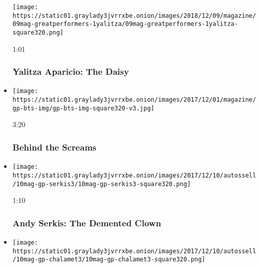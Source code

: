 \begin{itemize}
  \texttt{[image: https://static01.graylady3jvrrxbe.onion/images/2018/12/09/magazine/09mag-greatperformers-1yalitza/09mag-greatperformers-1yalitza-square320.png]}

  1:01

  \hypertarget{yalitza-aparicio-the-daisy}{%
  \subsubsection{Yalitza Aparicio: The
  Daisy}\label{yalitza-aparicio-the-daisy}}
\item
  \href{https://www.nytimes3xbfgragh.onion/video/magazine/100000005593268/behind-the-screams.html?action=click\&module=video-series-bar\&region=header\&pgtype=Article\&playlistId=video/great-performers}{}

  \texttt{[image: https://static01.graylady3jvrrxbe.onion/images/2017/12/01/magazine/gp-bts-img/gp-bts-img-square320-v3.jpg]}

  3:20

  \hypertarget{behind-the-screams}{%
  \subsubsection{Behind the Screams}\label{behind-the-screams}}
\item
  \href{https://www.nytimes3xbfgragh.onion/video/magazine/100000005588849/andy-serkis-the-demented-clown.html?action=click\&module=video-series-bar\&region=header\&pgtype=Article\&playlistId=video/great-performers}{}

  \texttt{[image: https://static01.graylady3jvrrxbe.onion/images/2017/12/10/autossell/10mag-gp-serkis3/10mag-gp-serkis3-square320.png]}

  1:10

  \hypertarget{andy-serkis-the-demented-clown}{%
  \subsubsection{Andy Serkis: The Demented
  Clown}\label{andy-serkis-the-demented-clown}}
\item
  \href{https://www.nytimes3xbfgragh.onion/video/magazine/100000005588864/timothee-chalamet-the-cannibal.html?action=click\&module=video-series-bar\&region=header\&pgtype=Article\&playlistId=video/great-performers}{}

  \texttt{[image: https://static01.graylady3jvrrxbe.onion/images/2017/12/10/autossell/10mag-gp-chalamet3/10mag-gp-chalamet3-square320.png]}


\end{itemize}
